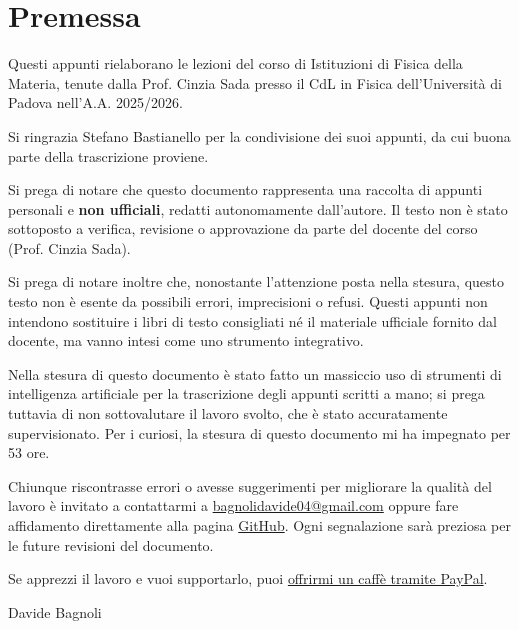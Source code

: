 \documentclass[12pt,a4paper,parskip=half,DIV=14,oneside,chapterprefix=true]{scrreprt}
\begin{document}
\tableofcontents
\newpage

\chapter*{Premessa}

Questi appunti rielaborano le lezioni del corso di Istituzioni di Fisica della Materia, tenute dalla Prof. Cinzia Sada presso il CdL in Fisica dell'Università di Padova nell'A.A. 2025/2026.

Si ringrazia Stefano Bastianello per la condivisione dei suoi appunti, da cui buona parte della trascrizione proviene.

\begin{attention}
    Si prega di notare che questo documento rappresenta una raccolta di appunti personali e \textbf{non ufficiali}, redatti autonomamente dall'autore. Il testo non è stato     
    sottoposto a verifica, revisione o approvazione da parte del docente del corso (Prof. Cinzia Sada).

    Si prega di notare inoltre che, nonostante l'attenzione posta nella stesura, questo testo non è esente da possibili errori, imprecisioni o refusi. Questi appunti non intendono sostituire i libri di testo consigliati né il materiale ufficiale fornito dal docente, ma vanno intesi come uno strumento integrativo.
\end{attention}

Nella stesura di questo documento è stato fatto un massiccio uso di strumenti di intelligenza artificiale per la trascrizione degli appunti scritti a mano; si prega tuttavia di non sottovalutare il lavoro svolto, che è stato accuratamente supervisionato. Per i curiosi, la stesura di questo documento mi ha impegnato per 53 ore.

Chiunque riscontrasse errori o avesse suggerimenti per migliorare la qualità del lavoro è invitato a contattarmi a \href{bagnolidavide04@gmail.com}{bagnolidavide04@gmail.com} oppure fare affidamento direttamente alla pagina \href{https://github.com/bagnolino/appunti-fisica-materia.git}{GitHub}. Ogni segnalazione sarà preziosa per le future revisioni del documento.

Se apprezzi il lavoro e vuoi supportarlo, puoi \href{https://paypal.me/DavideBagnoli04}{offrirmi un caffè tramite PayPal}.

\vspace{2cm}
\hfill Davide Bagnoli











\listoflezioni
\end{document}

